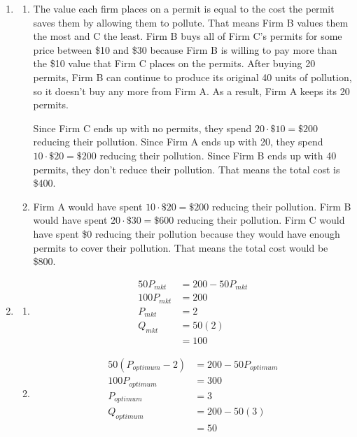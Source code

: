 \documentclass{article}
\begin{document}
\begin{enumerate}

\item 

	\begin{enumerate}
	
	\item The value each firm places on a permit is equal to the cost the permit saves them by allowing them to pollute. That means Firm B values them the most and C the least. Firm B buys all of Firm C's permits for some price between \$10 and \$30 because Firm B is willing to pay more than the \$10 value that Firm C places on the permits. After buying 20 permits, Firm B can continue to produce its original 40 units of pollution, so it doesn't buy any more from Firm A. As a result, Firm A keeps its 20 permits. 

Since Firm C ends up with no permits, they spend $20 \cdot \$10 = \$200$ reducing their pollution. Since Firm A ends up with 20, they spend $10 \cdot \$20 = \$200$ reducing their pollution. Since Firm B ends up with 40 permits, they don't reduce their pollution. That means the total cost is \$400.

	\item Firm A would have spent $10 \cdot \$20 = \$200$ reducing their pollution. Firm B would have spent $20 \cdot \$30 = \$600$ reducing their pollution. Firm C would have spent \$0 reducing their pollution because they would have enough permits to cover their pollution. That means the total cost would be \$800.

	\end{enumerate}
	
\item

	\begin{enumerate}
	
	\item
		\begin{align*}
		50P_{mkt} &= 200 - 50P_{mkt} \\
		100P_{mkt} &= 200 \\
		P_{mkt} &= 2 \\
		Q_{mkt} &= 50(2) \\
		&= 100
		\end{align*}
		
	\item
		\begin{align*}
		50(P_{optimum}-2) &= 200 - 50P_{optimum} \\
		100P_{optimum} &= 300 \\
		P_{optimum} &= 3 \\
		Q_{optimum} &= 200 - 50(3) \\
		&= 50
		\end{align*}
		

\end{enumerate}
\end{enumerate}
\end{document}
